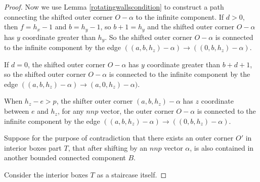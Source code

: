 \documentclass{amsart}[10pt]
\theoremstyle{plain}
\theoremstyle{definition}
\begin{document}
\begin{proof}
Now we use Lemma \ref{rotatingwallscondition} to construct a path connecting the shifted outer corner $O-\alpha$ to the infinite component. If $d>0$, then $f=h_x-1$ and $b=h_y-1$, so $b+1=h_y$ and the shifted outer corner $O-\alpha$ has $y$ coordinate greater than $h_y$. So the shifted outer corner $O-\alpha$ is connected to the infinite component by the edge $((a, b, h_z)-\alpha) \rightarrow ((0, b, h_z)-\alpha)$. 


If $d=0$, the shifted outer corner $O-\alpha$ has $y$ coordinate greater than $b+d+1$, so the shifted outer corner $O-\alpha$ is connected to the infinite component by the edge $((a, b, h_z)-\alpha) \rightarrow (a, 0, h_z)-\alpha)$. 


When $h_z-e > p$, the shifter outer corner $(a, b, h_z)-\alpha$ has $z$ coordinate between $e$ and $h_z$, for any $nnp$ vector, the outer corner $O-\alpha$ is connected to the infinite component by the edge $((a,b, h_z)-\alpha) \rightarrow ((0,b,h_z)-\alpha)$. 







Suppose for the purpose of contradiction that there exists an outer corner $O'$ in interior boxes part $T$, that after shifting by an $nnp$ vector $\alpha$, is also contained in another bounded connected component $B$.

Consider the interior boxes $T$ as a staircase itself. 


\end{proof}
\end{document}
